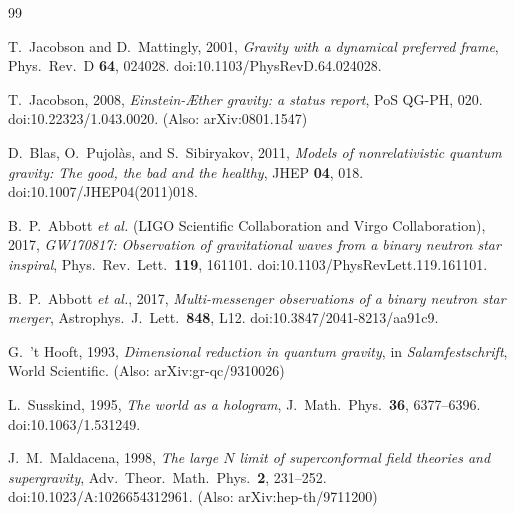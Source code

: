 \documentclass[11pt]{article}
\begin{document}
            \begin{thebibliography}{99}

                T.~Jacobson and D.~Mattingly, 2001,
                \textit{Gravity with a dynamical preferred frame},
                Phys.\ Rev.\ D \textbf{64}, 024028.
                doi:10.1103/PhysRevD.64.024028.

                T.~Jacobson, 2008,
                \textit{Einstein-\AE ther gravity: a status report},
                PoS QG-PH, 020.
                doi:10.22323/1.043.0020. (Also: arXiv:0801.1547)

                D.~Blas, O.~Pujol\`as, and S.~Sibiryakov, 2011,
                \textit{Models of nonrelativistic quantum gravity: The good, the bad and the healthy},
                JHEP \textbf{04}, 018.
                doi:10.1007/JHEP04(2011)018.

                B.~P.~Abbott \textit{et al.} (LIGO Scientific Collaboration and Virgo Collaboration), 2017,
                \textit{GW170817: Observation of gravitational waves from a binary neutron star inspiral},
                Phys.\ Rev.\ Lett.\ \textbf{119}, 161101.
                doi:10.1103/PhysRevLett.119.161101.

                B.~P.~Abbott \textit{et al.}, 2017,
                \textit{Multi-messenger observations of a binary neutron star merger},
                Astrophys.\ J.\ Lett.\ \textbf{848}, L12.
                doi:10.3847/2041-8213/aa91c9.

                G.~'t Hooft, 1993,
                \textit{Dimensional reduction in quantum gravity},
                in \textit{Salamfestschrift}, World Scientific. (Also: arXiv:gr-qc/9310026)

                L.~Susskind, 1995,
                \textit{The world as a hologram},
                J.\ Math.\ Phys.\ \textbf{36}, 6377--6396.
                doi:10.1063/1.531249.

                J.~M.~Maldacena, 1998,
                \textit{The large \(N\) limit of superconformal field theories and supergravity},
                Adv.\ Theor.\ Math.\ Phys.\ \textbf{2}, 231--252.
                doi:10.1023/A:1026654312961. (Also: arXiv:hep-th/9711200)


\end{thebibliography}
\end{document}
